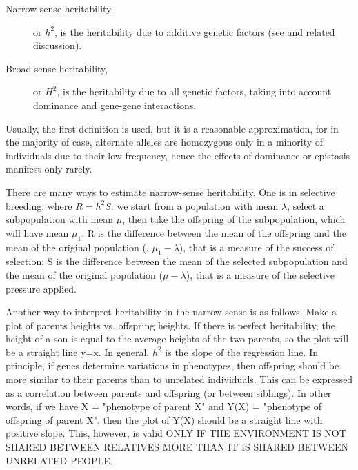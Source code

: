 \documentclass[../main.tex]{subfiles}
\begin{document}
\begin{description}
	\item[Narrow sense heritability,] or $h^2$, is the heritability due 
to additive genetic factors (see  and related 
discussion).
	\item[Broad sense heritability,] or $H^2$, is the heritability due 
to all genetic factors, taking into account dominance and gene-gene 
interactions.
\end{description}


Usually, the first definition is used, but it is a reasonable 
approximation, for in the majority of case, alternate alleles are 
homozygous only in a minority of individuals due to their low frequency, 
hence the effects of dominance or epistasis manifest only 
rarely\cite{Visscher2008march}.

There are many ways to estimate narrow-sense heritability. One is in 
selective breeding, where $R = h^2 S$: we start from a population with 
mean $\lambda$, select a subpopulation with mean $\mu$, then take the 
offspring of the subpopulation, which will have mean $\mu_1$. R is the 
difference between the mean of the offspring and the mean of the 
original population (\ie, $\mu_1 - \lambda$), that is a measure of the 
success of selection; S is the difference between the mean of the 
selected subpopulation and the mean of the original population (\ie $\mu 
- \lambda$), that is a measure of the selective pressure applied.

Another way to interpret heritability in the narrow sense is as follows. 
Make a plot of parents heights vs. offspring heights. If there is 
perfect heritability, the height of a son is equal to the average 
heights of the two parents, so the plot will be a straight line y=x. In 
general, $h^2$ is the slope of the regression line. In principle, if 
genes determine variations in phenotypes, then offspring should be more 
similar to their parents than to unrelated individuals. This can be 
expressed as a correlation between parents and offspring (or between 
siblings). In other words, if we have X = "phenotype of parent X" and 
Y(X) = "phenotype of offspring of parent X", then the plot of Y(X) 
should be a straight line with positive slope. This, however, is valid 
ONLY IF THE ENVIRONMENT IS NOT SHARED BETWEEN RELATIVES MORE THAN IT IS 
SHARED BETWEEN UNRELATED PEOPLE.
\end{document}
